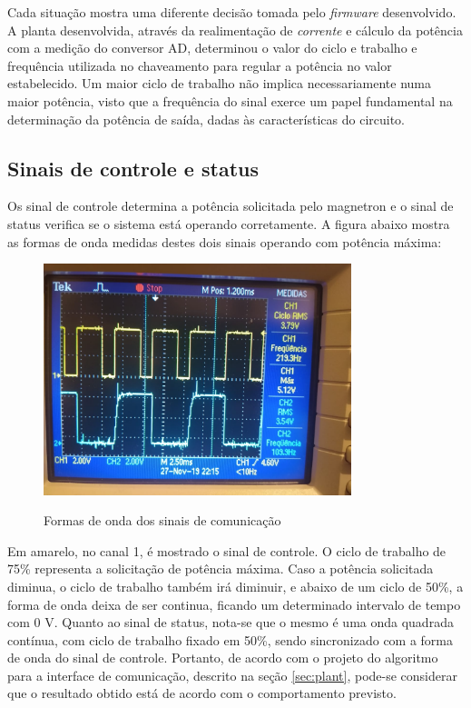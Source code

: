 Cada situação mostra uma diferente decisão tomada pelo \textit{firmware} desenvolvido. A planta desenvolvida, através da realimentação de \textit{corrente} e cálculo da potência com a medição do conversor AD, determinou o valor do ciclo e trabalho e frequência utilizada no chaveamento para regular a potência no valor estabelecido. Um maior ciclo de trabalho não implica necessariamente numa maior potência, visto que a frequência do sinal exerce um papel fundamental na determinação da potência de saída, dadas às características do circuito.

\subsection{Sinais de controle e status}
Os sinal de controle determina a potência solicitada pelo magnetron e o sinal de status verifica se o sistema está operando corretamente. A figura abaixo mostra as formas de onda medidas destes dois sinais operando com potência máxima:

\begin{figure}[H]
    \centering
    \caption{Formas de onda dos sinais de comunicação}
    \includegraphics[width=0.8\textwidth]{./dados/figuras/onda_comm}
    \label{fig:figura-onda_comm}
\end{figure}

Em amarelo, no canal 1, é mostrado o sinal de controle. O ciclo de trabalho de 75\% representa a solicitação de potência máxima. Caso a potência solicitada diminua, o ciclo de trabalho também irá diminuir, e abaixo de um ciclo de 50\%, a forma de onda deixa de ser continua, ficando um determinado intervalo de tempo com 0 V. Quanto ao sinal de status, nota-se que o mesmo é uma onda quadrada contínua, com ciclo de trabalho fixado em 50\%, sendo sincronizado com a forma de onda do sinal de controle. Portanto, de acordo com o projeto do algoritmo para a interface de comunicação, descrito na seção \ref{sec:plant}, pode-se considerar que o resultado obtido está de acordo com o comportamento previsto.


